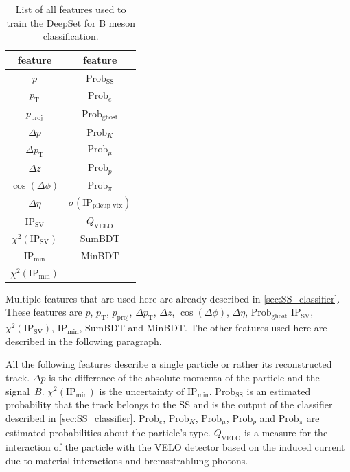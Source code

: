 \begin{table}
    \centering
    \caption{List of all features used to train the DeepSet for B meson classification.}
    \label{tab:B_features}
    \begin{tabular}{c c}
        \toprule
        feature & feature \\
        \midrule
        $p$                 & $\text{Prob}_\text{SS}$ \\ %
        $p_\text{T}$        & $\text{Prob}_e$ \\ %
        $p_\text{proj}$     & $\text{Prob}_\text{ghost}$ \\ %
        $\Delta p$          & $\text{Prob}_K$ \\ %
        $\Delta p_\text{T}$ & $\text{Prob}_\mu$ \\ %
        $\Delta z$          & $\text{Prob}_p$ \\ %
        $\cos(\Delta \phi)$ & $\text{Prob}_\pi$ \\ %
        $\Delta \eta$       & $\sigma(\text{IP}_\text{pileup vtx})$ \\ %
        $\text{IP}_\text{SV}$        & $Q_\text{VELO}$ \\ %
        $\chi^2(\text{IP}_\text{SV})$    & SumBDT \\ %
        $\text{IP}_\text{min}$               & MinBDT \\ %
        $\chi^2(\text{IP}_\text{min})$           & \\ %
        \bottomrule
    \end{tabular}
\end{table}

Multiple features that are used here are already described in \autoref{sec:SS_classifier}.
These features are 
$p$,
$p_\text{T}$, 
$p_\text{proj}$, 
$\Delta p_\text{T}$, 
$\Delta z$, 
$\cos(\Delta \phi)$, 
$\Delta \eta$, 
$\text{Prob}_\text{ghost}$
$\text{IP}_\text{SV}$, 
$\chi^2(\text{IP}_\text{SV})$, 
$\text{IP}_\text{min}$,        
SumBDT and
MinBDT.
The other features used here are described in the following paragraph.

All the following features describe a single particle or rather its reconstructed track.
$\Delta p$ is the difference of the absolute momenta of the particle and the signal~$B$.
$\chi^2(\text{IP}_\text{min})$ is the uncertainty of $\text{IP}_\text{min}$.
%
$\text{Prob}_\text{SS}$ is an estimated probability that the track belongs to the SS and is the output of the classifier described in \autoref{sec:SS_classifier}. 
$\text{Prob}_e$, 
$\text{Prob}_K$, 
$\text{Prob}_\mu$, 
$\text{Prob}_p$ and 
$\text{Prob}_\pi$ are estimated probabilities about the particle's type.
%
$Q_\text{VELO}$ is a measure for the interaction of the particle with the VELO detector based on the induced current due to material interactions and bremsstrahlung photons.


